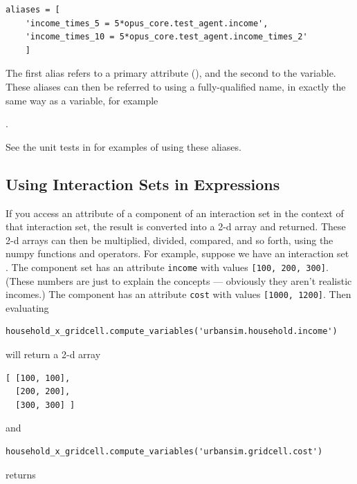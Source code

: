 \begin{verbatim}
aliases = [
    'income_times_5 = 5*opus_core.test_agent.income',
    'income_times_10 = 5*opus_core.test_agent.income_times_2'
    ]
\end{verbatim}

The first alias refers to a primary attribute (),
and the second to the variable.  These aliases can then be referred to
using a fully-qualified name, in exactly the same way as a variable,
for example

.  

See the unit tests in
 for examples of
using these aliases.

\subsection{Using Interaction Sets in Expressions}
\label{sec:urbansim-tutorial-interaction-sets}

If you access an attribute of a component of an interaction set in the
context of that interaction set, the result is converted into a 2-d array
and returned.  These 2-d arrays can then be multiplied, divided, compared,
and so forth, using the numpy functions and operators.  For example,
suppose we have an interaction set .  The
component  set has an attribute \verb|income| with values
\verb|[100, 200, 300]|.  (These numbers are just to explain the concepts
--- obviously they aren't realistic incomes.)  The 
component has an attribute \verb|cost| with values \verb|[1000, 1200]|.
Then evaluating

\begin{verbatim}
household_x_gridcell.compute_variables('urbansim.household.income')
\end{verbatim}

will return a 2-d array

\begin{verbatim}
[ [100, 100],
  [200, 200],
  [300, 300] ]
\end{verbatim}

and

\begin{verbatim}
household_x_gridcell.compute_variables('urbansim.gridcell.cost')
\end{verbatim}

returns

